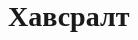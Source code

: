 
\makeatletter
\providecommand{\filcenter}{\centering}
\providecommand{\bffamily}{\bfseries}
\makeatother
\label{AppendixA} %
\chapter*{Хавсралт}
